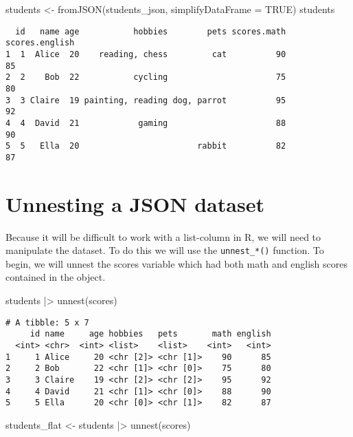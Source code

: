 \documentclass[
  letterpaper,
  DIV=11,
  numbers=noendperiod]{scrreprt}
\newenvironment{Shaded}{\begin{snugshade}}{\end{snugshade}}
\newcommand{\AttributeTok}[1]{\textcolor[rgb]{0.40,0.45,0.13}{#1}}
\newcommand{\ConstantTok}[1]{\textcolor[rgb]{0.56,0.35,0.01}{#1}}
\newcommand{\FunctionTok}[1]{\textcolor[rgb]{0.28,0.35,0.67}{#1}}
\newcommand{\NormalTok}[1]{\textcolor[rgb]{0.00,0.23,0.31}{#1}}
\newcommand{\OtherTok}[1]{\textcolor[rgb]{0.00,0.23,0.31}{#1}}
\newcommand{\SpecialCharTok}[1]{\textcolor[rgb]{0.37,0.37,0.37}{#1}}
\begin{document}
\begin{Shaded}
\begin{Highlighting}[]
\NormalTok{students }\OtherTok{\textless{}{-}} \FunctionTok{fromJSON}\NormalTok{(students\_json, }\AttributeTok{simplifyDataFrame =} \ConstantTok{TRUE}\NormalTok{)}
\NormalTok{students}
\end{Highlighting}
\end{Shaded}

\begin{verbatim}
  id   name age           hobbies        pets scores.math scores.english
1  1  Alice  20    reading, chess         cat          90             85
2  2    Bob  22           cycling                      75             80
3  3 Claire  19 painting, reading dog, parrot          95             92
4  4  David  21            gaming                      88             90
5  5   Ella  20                        rabbit          82             87
\end{verbatim}

\section{Unnesting a JSON dataset}\label{unnesting-a-json-dataset}

Because it will be difficult to work with a list-column in R, we will
need to manipulate the dataset. To do this we will use the
\texttt{unnest\_*()} function. To begin, we will unnest the scores
variable which had both math and english scores contained in the object.

\begin{Shaded}
\begin{Highlighting}[]
\NormalTok{students }\SpecialCharTok{|\textgreater{}} \FunctionTok{unnest}\NormalTok{(scores)}
\end{Highlighting}
\end{Shaded}

\begin{verbatim}
# A tibble: 5 x 7
     id name     age hobbies   pets       math english
  <int> <chr>  <int> <list>    <list>    <int>   <int>
1     1 Alice     20 <chr [2]> <chr [1]>    90      85
2     2 Bob       22 <chr [1]> <chr [0]>    75      80
3     3 Claire    19 <chr [2]> <chr [2]>    95      92
4     4 David     21 <chr [1]> <chr [0]>    88      90
5     5 Ella      20 <chr [0]> <chr [1]>    82      87
\end{verbatim}

\begin{Shaded}
\begin{Highlighting}[]
\NormalTok{students\_flat }\OtherTok{\textless{}{-}}\NormalTok{ students }\SpecialCharTok{|\textgreater{}} \FunctionTok{unnest}\NormalTok{(scores)}
\end{Highlighting}
\end{Shaded}
\end{document}
